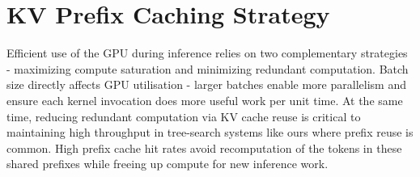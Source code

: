 \documentclass[11pt,twoside]{report}
\begin{document}
\chapter{KV Prefix Caching Strategy}

Efficient use of the GPU during inference relies on two complementary strategies - maximizing compute saturation and minimizing redundant computation. 
Batch size directly affects GPU utilisation - larger batches enable more parallelism and ensure each kernel invocation does more useful work per unit time. 
At the same time, reducing redundant computation via KV cache reuse is critical to maintaining high throughput in tree-search systems like ours where prefix reuse is common.
High prefix cache hit rates avoid recomputation of the tokens in these shared prefixes while freeing up compute for new inference work.
\end{document}
